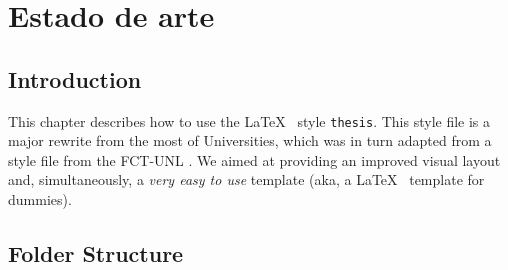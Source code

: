 % 
%  
%
\chapter{Estado de arte}
\label{cha:estado_de_arte}

\section{Introduction} %
\label{sec:introduction}

This chapter describes how to use the \LaTeX~ style \texttt{thesis{}}. This style file is a major rewrite from the most of Universities, which was in turn adapted from a style file from the FCT-UNL \cite{novathesis-manual}.  We aimed at providing an improved visual layout and, simultaneously, a \emph{very easy to use} template (aka, a  \LaTeX~ template for dummies). 


\section{Folder Structure} %
\label{sec:folder_structure}

